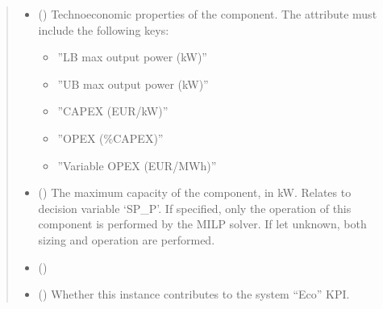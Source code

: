 \documentclass[letterpaper,10pt,english]{sphinxmanual}
\begin{document}
\begin{fulllineitems}
\begin{fulllineitems}
\begin{quote}
\begin{description}
\begin{itemize}
\item {} 
\sphinxAtStartPar
{} (\sphinxstyleliteralemphasis{\sphinxupquote{ | }}) \textendash{} 
\sphinxAtStartPar
Techno\sphinxhyphen{}economic properties of the component.
The  attribute must include the following keys:
\begin{itemize}
\item {} 
\sphinxAtStartPar
”LB max output power (kW)”

\item {} 
\sphinxAtStartPar
”UB max output power (kW)”

\item {} 
\sphinxAtStartPar
”CAPEX (EUR/kW)”

\item {} 
\sphinxAtStartPar
”OPEX (\%CAPEX)”

\item {} 
\sphinxAtStartPar
”Variable OPEX (EUR/MWh)”

\end{itemize}


\item {} 
\sphinxAtStartPar
{} (\sphinxstyleliteralemphasis{\sphinxupquote{, }}) \textendash{} The maximum capacity of the component, in kW.
Relates to decision variable ‘SP\_P’.
If specified, only the operation of this component is performed by the MILP solver.
If let unknown, both sizing and operation are performed.

\item {} 
\sphinxAtStartPar
{} (\sphinxstyleliteralemphasis{\sphinxupquote{, }}) \textendash{} 

\item {} 
\sphinxAtStartPar
{} (\sphinxstyleliteralemphasis{\sphinxupquote{, }}\sphinxstyleliteralemphasis{\sphinxupquote{, }}) \textendash{} Whether this instance contributes to the system “Eco” KPI.


\end{itemize}
\end{description}
\end{quote}
\end{fulllineitems}
\end{fulllineitems}
\end{document}
